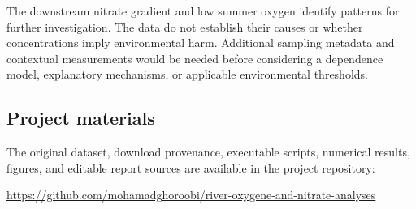 The downstream nitrate gradient and low summer oxygen identify patterns for further investigation. The data do not establish their causes or whether concentrations imply environmental harm. Additional sampling metadata and contextual measurements would be needed before considering a dependence model, explanatory mechanisms, or applicable environmental thresholds.

\subsection{Project materials}
The original dataset, download provenance, executable scripts, numerical results, figures, and editable report sources are available in the project repository:\par
\small\url{https://github.com/mohamadghoroobi/river-oxygene-and-nitrate-analyses}
